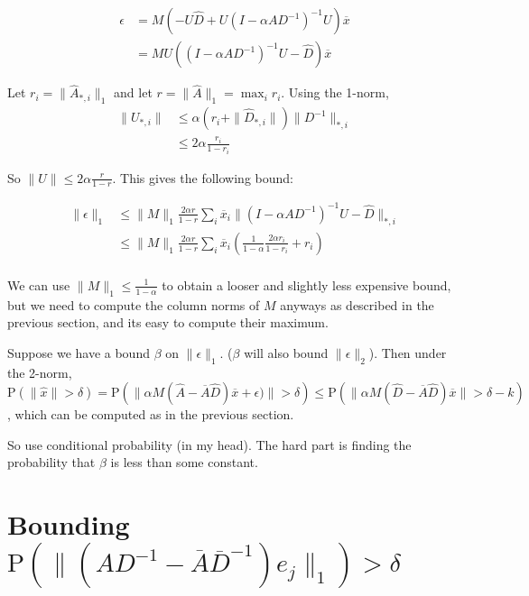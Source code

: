 \documentclass{article}
\newcommand \p[1] {\mathrm P \left(#1\right)}
\newcommand \inv [1] {{#1}^{-1}} %
\begin{document}
\begin{align*}
\epsilon &= M\left(-U\hat D + U(I-\alpha A\inv D)^{-1}U\right)\overline x \\
&= MU\left((I-\alpha A\inv D)^{-1}U - \hat D\right)\overline x
\end{align*}

Let $r_i = \|\hat A_{*,i}\|_1$ and let $r=\|\hat A\|_1=\max_i r_i$. Using the 1-norm,
\begin{align*}
\|U_{*,i}\| &\leq \alpha\left(r_i + \|\hat D_{*,i}\|\right)\|\inv D\|_{*,i} \\
&\leq 2\alpha\frac{r_i}{1-r_i}
\end{align*}

So $\|U\| \leq 2\alpha \frac{r}{1-r}$. This gives the following bound: %

\begin{align*}
\|\epsilon\|_1 &\leq \|M\|_1\frac{2\alpha r}{1-r}\sum_i \overline x_i \|(I-\alpha A\inv D)^{-1}U-\hat D\|_{*,i} \\
&\leq \|M\|_1\frac{2\alpha r}{1-r}\sum_i\overline x_i\left(\frac 1{1-\alpha}\frac{2\alpha r_i}{1-r_i} + r_i\right) \\
\end{align*}

We can use $\|M\|_1 \leq \frac 1{1-\alpha}$ to obtain a looser and slightly less expensive bound, but we need to compute the column norms of $M$ anyways as described in the previous section, and its easy to compute their maximum.

Suppose we have a bound $\beta$ on $\|\epsilon\|_1$. ($\beta$ will also bound $\|\epsilon\|_2$). Then under the 2-norm, $\p{\|\hat x\| > \delta} = \p{\|\alpha M(\hat A-\overline A\hat D)\overline x + \epsilon)\|>\delta} \leq \p{\|\alpha M(\hat D-\overline A\hat D)\overline x\|>\delta - k}$, which can be computed as in the previous section.

So use conditional probability (in my head). The hard part is finding the probability that $\beta$ is less than some constant.

\section{Bounding $\p{\|(A\inv D - \overline A\inv{\overline D})e_j\|_1}>\delta$}
\end{document}
